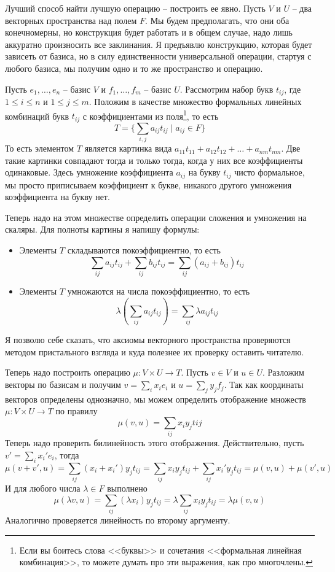 Лучший способ  найти лучшую операцию -- построить ее явно. Пусть $V$ и $U$ -- два векторных пространства над полем $F$. Мы будем предполагать, что они оба конечномерны, но конструкция будет работать и в общем случае, надо лишь аккуратно произносить все заклинания. Я предъявлю конструкцию, которая будет зависеть от базиса, но в силу единственности универсальной операции, стартуя с любого базиса, мы получим одно и то же пространство и операцию.

Пусть $e_1,\ldots,e_n$ -- базис $V$ и $f_1,\ldots,f_m$ -- базис $U$. Рассмотрим набор букв $t_{ij}$, где $1\leqslant i\leqslant n$ и $1\leqslant j \leqslant m$. Положим в качестве множество формальных линейных комбинаций букв $t_{ij}$ с коэффициентами из поля\footnote{Если вы боитесь слова <<буквы>> и сочетания <<формальная линейная комбинация>>, то можете думать про эти выражения, как про многочлены.}, то есть
\[
T = \{\sum_{i,j}a_{ij}t_{ij}\mid a_{ij}\in F\}
\]
То есть элементом $T$ является картинка вида $a_{11}t_{11} + a_{12}t_{12} + \ldots + a_{nm}t_{nm}$. Две такие картинки совпадают тогда и только тогда, когда у них все коэффициенты одинаковые. Здесь умножение коэффициента $a_{ij}$ на букву $t_{ij}$ чисто формальное, мы просто приписываем коэффициент к букве, никакого другого умножения коэффициента на букву нет.

Теперь надо на этом множестве определить операции сложения и умножения на скаляры. Для полноты картины я напишу формулы:
\begin{itemize}
\item Элементы $T$ складываются покоэффициентно, то есть
\[
\sum_{ij}a_{ij}t_{ij} + \sum_{ij}b_{ij}t_{ij} = \sum_{ij}(a_{ij}+b_{ij})t_{ij}
\]
\item Элементы $T$ умножаются на числа покоэффициентно, то есть
\[
\lambda(\sum_{ij} a_{ij}t_{ij}) = \sum_{ij} \lambda a_{ij}t_{ij}
\]
\end{itemize}
Я позволю себе сказать, что аксиомы векторного пространства проверяются методом пристального взгляда и куда полезнее их проверку оставить читателю.


Теперь надо построить операцию $\mu\colon V\times U\to T$. Пусть $v\in V$ и $u\in U$. Разложим векторы по базисам и получим $v = \sum_i x_i e_i$ и $u = \sum_j y_j f_j$. Так как координаты векторов определены однозначно, мы можем определить отображение множеств $\mu\colon V\times U\to T$ по правилу
\[
\mu(v, u) = \sum_{ij}x_iy_j t{ij}
\]
Теперь надо проверить билинейность этого отображения. Действительно, пусть $v' = \sum_{i} x_i'e_i$, тогда
\[
\mu(v + v', u) = \sum_{ij}(x_i + x_i')y_j t_{ij} = \sum_{ij}x_iy_j t_{ij} +\sum_{ij}x_i'y_j t_{ij}  =\mu(v, u) + \mu(v', u)
\]
И для любого числа $\lambda \in F$ выполнено
\[
\mu(\lambda v, u) = \sum_{ij} (\lambda x_i)y_jt_{ij} = \lambda \sum_{ij}x_iy_jt_{ij} = \lambda\mu(v, u)
\]
Аналогично проверяется линейность по второму аргументу.

